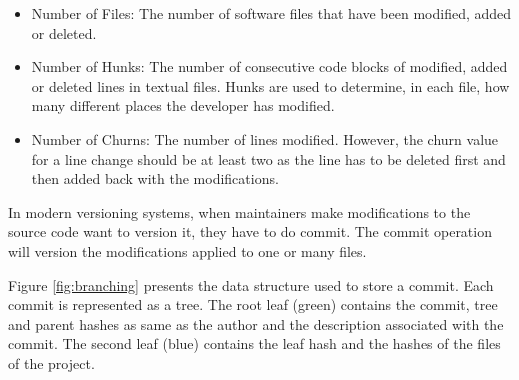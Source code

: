 \begin{itemize}
\item Number of Files: The number of software files that have been modified, added or deleted.
\item Number of Hunks: The number of consecutive code blocks of modified, added or deleted lines in textual files. Hunks are used to determine, in each file, how many different places the developer has modified.
\item Number of Churns:  The number of lines modified. However, the churn value for a line change should be at least two as the line has to be deleted first and then added back with the modifications.
\end{itemize}

In modern versioning systems, when maintainers make modifications to the source code want to version it, they have to do commit.
The commit operation will version the modifications applied to one or many files.

Figure \ref{fig:branching} presents the data structure used to store a commit.
Each commit is represented as a tree.
The root leaf (green) contains the commit, tree and parent hashes as same as the author and the description associated with the commit.
The second leaf (blue) contains the leaf hash and the hashes of the files of the project.

